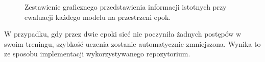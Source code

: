 \begin{figure}[H]
\hspace{-1.5cm}
\caption{Zestawienie graficznego przedstawienia informacji istotnych przy ewaluacji każdego modelu na przestrzeni epok.}
\label{fig:inf}
\end{figure}

\hspace{0.5cm}
W przypadku, gdy przez dwie epoki sieć nie poczyniła żadnych postępów w swoim treningu, szybkość uczenia zostanie automatycznie zmniejszona. Wynika to ze sposobu implementacji  wykorzystywanego repozytorium.


